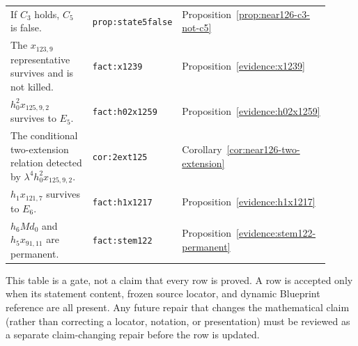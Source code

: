 \begin{center}
\begin{tabular}{p{0.49\linewidth}p{0.17\linewidth}p{0.25\linewidth}}
If $C_3$ holds, $C_5$ is false. & \texttt{prop:state5false} & Proposition~\ref{prop:near126-c3-not-c5} \\
The $x_{123,9}$ representative survives and is not killed. & \texttt{fact:x1239} & Proposition~\ref{evidence:x1239} \\
$h_0^2x_{125,9,2}$ survives to $E_5$. & \texttt{fact:h02x1259} & Proposition~\ref{evidence:h02x1259} \\
The conditional two-extension relation detected by $\lambda^4h_0^2x_{125,9,2}$. & \texttt{cor:2ext125} & Corollary~\ref{cor:near126-two-extension} \\
$h_1x_{121,7}$ survives to $E_6$. & \texttt{fact:h1x1217} & Proposition~\ref{evidence:h1x1217} \\
$h_6Md_0$ and $h_5x_{91,11}$ are permanent. & \texttt{fact:stem122} & Proposition~\ref{evidence:stem122-permanent} \\
\end{tabular}
\end{center}

This table is a gate, not a claim that every row is proved. A row is accepted
only when its statement content, frozen source locator, and dynamic Blueprint
reference are all present. Any future repair that changes the mathematical
claim (rather than correcting a locator, notation, or presentation) must be
reviewed as a separate claim-changing repair before the row is updated.
